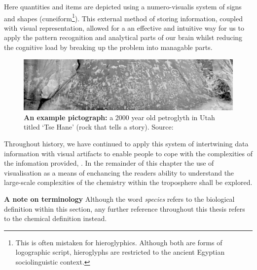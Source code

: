 Here quantities and items are depicted using a numero-visualis system of signs and shapes (cuneiform\footnote{This is often mistaken for hieroglyphics. Although both are forms of logographic script, hieroglyphs are restricted to the ancient Egyptian sociolinguistic context. }). This external method of storing information, coupled with visual representation, allowed for a an effective and intuitive way for us to apply the pattern recognition and analytical parts of our brain whilst reducing the cognitive load by breaking up the problem into managable parts. 


\begin{figure}[H]
         \centering
         \includegraphics[width=\textwidth]{figures_c1/newspaperrock.jpg}
        \caption{\textbf{An example pictograph:} a 2000 year old petroglyth in Utah titled `Tse Hane' (rock that tells a story). Source:
        \cite{newspaperrock} }
        \label{cave}
\end{figure}

Throughout history, we have continued to apply this system of intertwining data information with visual artifacts to enable people to cope with the complexities of the infomation provided, \cite{tufte}. In the remainder of this chapter the use of visualisation as a means of enchancing the readers ability to understand the large-scale complexities of the chemistry within the troposphere shall be explored. 


\textbf{A note on terminology}
Although the word \emph{species} refers to the biological definition within this section, any further reference throughout this thesis refers to the chemical definition instead. 





